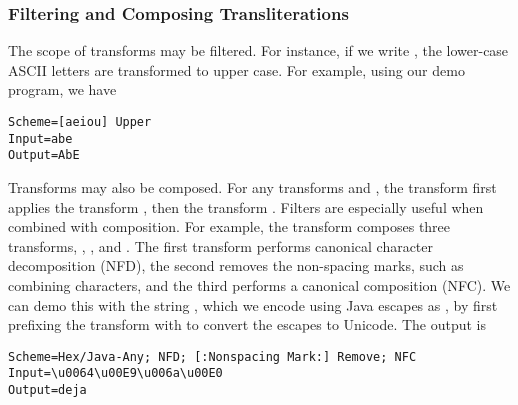 \subsubsection{Filtering and Composing Transliterations}

The scope of transforms may be filtered. For instance, if we write
, the lower-case ASCII letters are transformed
to upper case.  For example,
using our demo program, we have
%
\begin{verbatim}
Scheme=[aeiou] Upper
Input=abe
Output=AbE
\end{verbatim}
%

Transforms may also be composed.  For any transforms  
and , the transform  first applies the transform
, then the transform .  
Filters are especially useful when combined with composition.  For
example, the transform
composes three transforms, , , and .  The first transform performs canonical
character decomposition (NFD), the second removes the non-spacing
marks, such as combining characters, and the third performs a
canonical composition (NFC).  We can demo this with the string
, which we encode using Java escapes as
, by first prefixing
the transform with \code{Hex/Java-Any} to convert the escapes to Unicode.
The output is
%
\begin{verbatim}
Scheme=Hex/Java-Any; NFD; [:Nonspacing Mark:] Remove; NFC
Input=\u0064\u00E9\u006a\u00E0
Output=deja
\end{verbatim}








